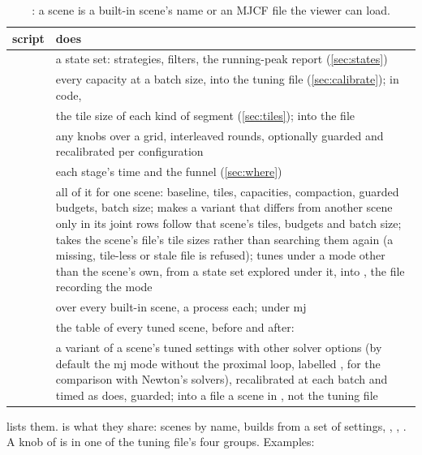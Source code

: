 \begin{table}[t]
\centering
\caption{: a scene is a built-in scene's name or an MJCF file the viewer can load.}
\label{tab:tools}
\small
\begin{tabularx}{\linewidth}{@{}L{25mm}Y@{}}
\toprule
script & does \\
\midrule
{} & a state set: strategies, filters, the running-peak report (\cref{sec:states}) \\
 & every capacity at a batch size, into the tuning file (\cref{sec:calibrate}); in code,  \\
 & the tile size of each kind of segment (\cref{sec:tiles});  into the file \\
 & any knobs over a grid, interleaved rounds, optionally guarded and recalibrated per configuration \\
 & each stage's time and the funnel (\cref{sec:where}) \\
 & all of it for one scene: baseline, tiles, capacities, compaction, guarded budgets, batch size;  makes a variant that differs from another scene only in its joint rows follow that scene's tiles, budgets and batch size;  takes the scene's file's tile sizes rather than searching them again (a missing, tile-less or stale file is refused);  tunes under a mode other than the scene's own, from a state set explored under it, into , the file recording the mode \\
 &  over every built-in scene, a process each;  under mj \\
 & the table of every tuned scene, before and after:  \\
 & a variant of a scene's tuned settings with other solver options (by default the mj mode without the proximal loop, labelled , for the comparison with Newton's solvers), recalibrated at each batch and timed as  does, guarded; into a file a scene in , not the tuning file \\
\bottomrule
\end{tabularx}
\end{table}

 lists them.  is what they share: scenes by name, builds from a set of settings, , , . A knob of  is  in one of the tuning file's four groups. Examples:

